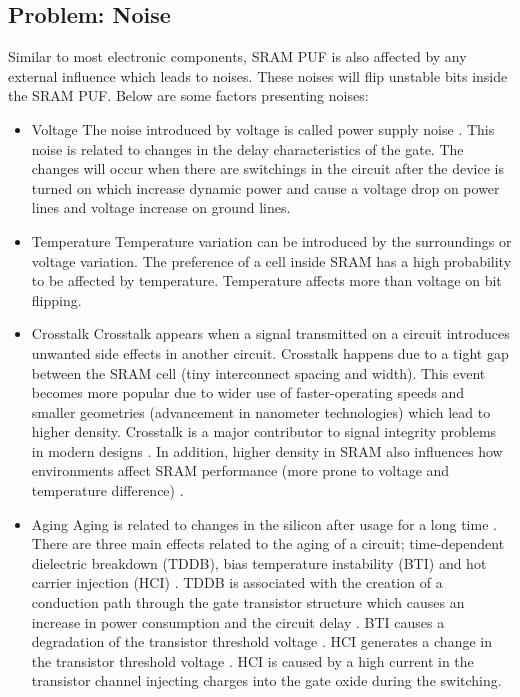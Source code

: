 \subsection{Problem: Noise}\label{ch:sram_noise}

Similar to most electronic components, SRAM PUF is also affected by any external influence which leads to noises. These noises will flip unstable bits inside the SRAM PUF. Below are some factors presenting noises:

\begin{itemize}
\item Voltage\newline
The noise introduced by voltage is called power supply noise \cite{wang_tehranipoor_2010}. This noise is related to changes in the delay characteristics of the gate. The changes will occur when there are switchings in the circuit after the device is turned on which increase dynamic power and cause a voltage drop on power lines and voltage increase on ground lines.
\item Temperature\newline
Temperature variation can be introduced by the surroundings or voltage variation. The preference of a cell inside SRAM has a high probability to be affected by temperature.
Temperature affects more than voltage on bit flipping.
\item Crosstalk\newline
Crosstalk appears when a signal transmitted on a circuit introduces unwanted side effects in another circuit. Crosstalk happens due to a tight gap between the SRAM cell (tiny interconnect spacing and width). This event becomes more popular due to wider use of faster-operating speeds and smaller geometries (advancement in nanometer technologies) which lead to higher density. Crosstalk is a major contributor to signal integrity problems in modern designs \cite{wang_tehranipoor_2010}. In addition, higher density in SRAM also influences how environments affect SRAM performance (more prone to voltage and temperature difference) \cite{Abu-Rahma2013}.
\item Aging\newline
Aging is related to changes in the silicon after usage for a long time \cite{rao_mahmoodi_2011}. There are three main effects related to the aging of a circuit; time-dependent dielectric breakdown (TDDB), bias temperature instability (BTI) and hot carrier injection (HCI) \cite{Maricau2013}. TDDB is associated with the creation of a conduction path through the gate transistor structure which causes an increase in power consumption and the circuit delay \cite{impact_mosfet}.
BTI causes a degradation of the transistor threshold voltage \cite{temporal_performance}.
HCI generates a change in the transistor threshold voltage \cite{impact_hot_carriers}. HCI is caused by a high current in the transistor channel injecting charges into the gate oxide during the switching.
\end{itemize}


